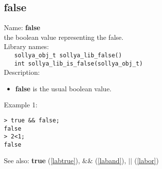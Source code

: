 \subsection{false}
\label{labfalse}
\noindent Name: \textbf{false}\\
\phantom{aaa}the boolean value representing the false.\\[0.2cm]
\noindent Library names:\\
\verb|   sollya_obj_t sollya_lib_false()|\\
\verb|   int sollya_lib_is_false(sollya_obj_t)|\\[0.2cm]
\noindent Description: \begin{itemize}

\item \textbf{false} is the usual boolean value.
\end{itemize}
\noindent Example 1: 
\begin{center}\begin{minipage}{15cm}\begin{Verbatim}[frame=single,commandchars=\\\|\~]
> true && false;
false
> 2<1;
false
\end{Verbatim}
\end{minipage}\end{center}
See also: \textbf{true} (\ref{labtrue}), \textbf{$\&\&$} (\ref{laband}), \textbf{$||$} (\ref{labor})
